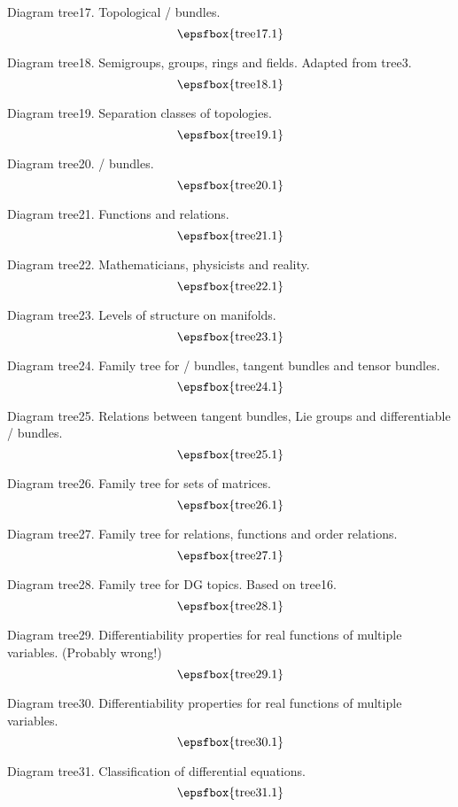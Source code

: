 Diagram tree17. Topological \fibre/ bundles.
$$
\centerline{\epsfbox{tree17.1}}
$$

Diagram tree18. Semigroups, groups, rings and fields. Adapted from tree3.
$$
\centerline{\epsfbox{tree18.1}}
$$

\filleject

Diagram tree19. Separation classes of topologies.
$$
\centerline{\epsfbox{tree19.1}}
$$

Diagram tree20. \Fibre/ bundles.
$$
\centerline{\epsfbox{tree20.1}}
$$

Diagram tree21. Functions and relations.
$$
\centerline{\epsfbox{tree21.1}}
$$

Diagram tree22. Mathematicians, physicists and reality.
$$
\centerline{\epsfbox{tree22.1}}
$$

Diagram tree23. Levels of structure on manifolds.
$$
\centerline{\epsfbox{tree23.1}}
$$

\filleject

Diagram tree24. Family tree for \fibre/ bundles, tangent bundles and tensor
bundles.
$$
\centerline{\epsfbox{tree24.1}}
$$

Diagram tree25. Relations between tangent bundles, Lie groups and differentiable
\fibre/ bundles.
$$
\centerline{\epsfbox{tree25.1}}
$$

Diagram tree26. Family tree for sets of matrices.
$$
\centerline{\epsfbox{tree26.1}}
$$

Diagram tree27. Family tree for relations, functions and order relations.
$$
\centerline{\epsfbox{tree27.1}}
$$

\filleject

Diagram tree28. Family tree for DG topics. Based on tree16.
$$
\centerline{\epsfbox{tree28.1}}
$$

Diagram tree29. Differentiability properties for real functions of multiple
variables. (Probably wrong!)
$$
\centerline{\epsfbox{tree29.1}}
$$

Diagram tree30. Differentiability properties for real functions of multiple
variables.
$$
\centerline{\epsfbox{tree30.1}}
$$

Diagram tree31. Classification of differential equations.
$$
\centerline{\epsfbox{tree31.1}}
$$

\filleject

